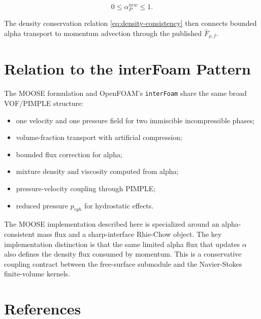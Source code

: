 \documentclass[11pt]{article}
\begin{document}
\begin{equation}
  0\le\alpha_P^{new}\le 1.
\end{equation}

The density conservation relation \eqref{eq:density-consistency} then connects
bounded alpha transport to momentum advection through the published
\(\bar{F}_{\rho,f}\).

\section{Relation to the interFoam Pattern}

The MOOSE formulation and OpenFOAM's \texttt{interFoam} share the same broad
VOF/PIMPLE structure:

\begin{itemize}[leftmargin=2.5em]
  \item one velocity and one pressure field for two immiscible incompressible
        phases;
  \item volume-fraction transport with artificial compression;
  \item bounded flux correction for alpha;
  \item mixture density and viscosity computed from alpha;
  \item pressure-velocity coupling through PIMPLE;
  \item reduced pressure \(p_{rgh}\) for hydrostatic effects.
\end{itemize}

The MOOSE implementation described here is specialized around an
alpha-consistent mass flux and a sharp-interface Rhie-Chow object.  The key
implementation distinction is that the same limited alpha flux that updates
\(\alpha\) also defines the density flux consumed by momentum.  This is a
conservative coupling contract between the free-surface submodule and the
Navier-Stokes finite-volume kernels.

\section{References}
\end{document}
